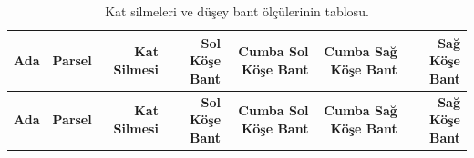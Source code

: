 \documentclass[12pt,turkish,a4paperpaper,]{report}
\begin{document}
\begin{longtable}[]{@{}rrrrrrr@{}}
\caption{Kat silmeleri ve düşey bant ölçülerinin tablosu.
\label{silmebantolcu}}\tabularnewline
\toprule
\begin{minipage}[b]{0.06\columnwidth}\raggedleft
\textbf{Ada}\strut
\end{minipage} & \begin{minipage}[b]{0.08\columnwidth}\raggedleft
\textbf{Parsel}\strut
\end{minipage} & \begin{minipage}[b]{0.11\columnwidth}\raggedleft
\textbf{Kat Silmesi}\strut
\end{minipage} & \begin{minipage}[b]{0.12\columnwidth}\raggedleft
\textbf{Sol Köşe Bant}\strut
\end{minipage} & \begin{minipage}[b]{0.16\columnwidth}\raggedleft
\textbf{Cumba Sol Köşe Bant}\strut
\end{minipage} & \begin{minipage}[b]{0.16\columnwidth}\raggedleft
\textbf{Cumba Sağ Köşe Bant}\strut
\end{minipage} & \begin{minipage}[b]{0.12\columnwidth}\raggedleft
\textbf{Sağ Köşe Bant}\strut
\end{minipage}\tabularnewline
\midrule
\endfirsthead
\toprule
\begin{minipage}[b]{0.06\columnwidth}\raggedleft
\textbf{Ada}\strut
\end{minipage} & \begin{minipage}[b]{0.08\columnwidth}\raggedleft
\textbf{Parsel}\strut
\end{minipage} & \begin{minipage}[b]{0.11\columnwidth}\raggedleft
\textbf{Kat Silmesi}\strut
\end{minipage} & \begin{minipage}[b]{0.12\columnwidth}\raggedleft
\textbf{Sol Köşe Bant}\strut
\end{minipage} & \begin{minipage}[b]{0.16\columnwidth}\raggedleft
\textbf{Cumba Sol Köşe Bant}\strut
\end{minipage} & \begin{minipage}[b]{0.16\columnwidth}\raggedleft
\textbf{Cumba Sağ Köşe Bant}\strut
\end{minipage} & \begin{minipage}[b]{0.12\columnwidth}\raggedleft
\textbf{Sağ Köşe Bant}\strut

\end{minipage}
\end{longtable}
\end{document}
